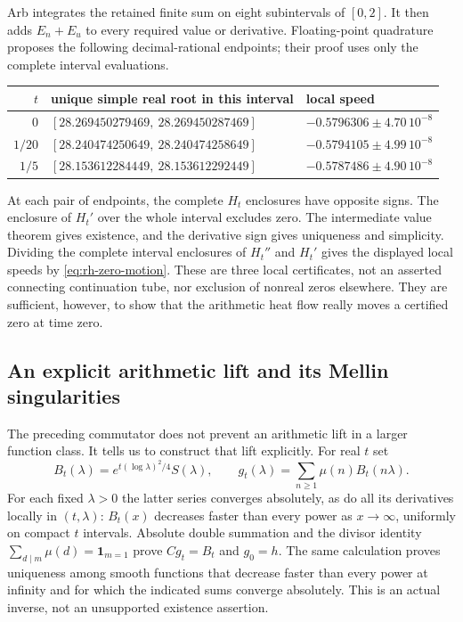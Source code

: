 Arb integrates the retained finite sum on eight subintervals of
$[0,2]$. It then adds $E_n+E_u$ to every required value or derivative.
Floating-point quadrature proposes the following decimal-rational
endpoints; their proof uses only the complete interval evaluations.
\begin{center}
\begin{tabular}{rll}
\toprule
$t$ & unique simple real root in this interval & local speed\\
\midrule
$0$ & $[28.269450279469,\ 28.269450287469]$ & $-0.5796306\pm4.70\,10^{-8}$\\
$1/20$ & $[28.240474250649,\ 28.240474258649]$ & $-0.5794105\pm4.99\,10^{-8}$\\
$1/5$ & $[28.153612284449,\ 28.153612292449]$ & $-0.5787486\pm4.90\,10^{-8}$\\
\bottomrule
\end{tabular}
\end{center}
At each pair of endpoints, the complete $H_t$ enclosures have opposite
signs. The enclosure of $H_t'$ over the whole interval excludes zero.
The intermediate value theorem gives existence, and the derivative
sign gives uniqueness and simplicity. Dividing the complete interval
enclosures of $H_t''$ and $H_t'$ gives the displayed local speeds by
\eqref{eq:rh-zero-motion}. These are three local certificates, not
an asserted connecting continuation tube, nor exclusion of nonreal
zeros elsewhere. They are sufficient, however, to show that the
arithmetic heat flow really moves a certified zero at time zero.

\subsection{An explicit arithmetic lift and its Mellin singularities}
\label{sec:rh-mobius-heat-lift}

The preceding commutator does not prevent an arithmetic lift in a
larger function class. It tells us to construct that lift explicitly.
For real $t$ set
\begin{equation}
 B_t(\lambda)=e^{t(\log\lambda)^2/4}S(\lambda),\qquad
 g_t(\lambda)=\sum_{n\ge1}\mu(n)B_t(n\lambda).
 \label{eq:rh-mobius-heat-lift}
\end{equation}
For each fixed $\lambda>0$ the latter series converges absolutely,
as do all its derivatives locally in $(t,\lambda)$: $B_t(x)$
decreases faster than every power as $x\to\infty$, uniformly on
compact $t$ intervals. Absolute double summation and the divisor
identity $\sum_{d\mid m}\mu(d)=\boldsymbol1_{m=1}$ prove
$Cg_t=B_t$ and $g_0=h$. The same calculation proves uniqueness among
smooth functions that decrease faster than every power at infinity
and for which the indicated sums converge absolutely.
This is an actual inverse, not an unsupported existence assertion.

